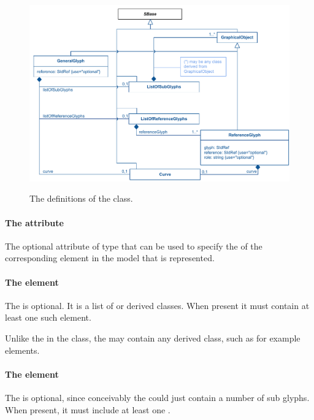 \begin{figure}[!h]
\includegraphics[scale=0.9]{uml/layout-generalglyph-model-uml}\\
\label{uml:generalglyph}
\caption{The definitions of the \GeneralGlyph class.}
\end{figure}

\paragraph{The  attribute}
The optional  attribute of type  that 
can be used to specify the  of the corresponding element in 
the model that is represented. 


\paragraph {The  element}
\label{listofsubglyphs-class}
The \ListOfSubGlyphs is optional. It is a list of \GraphicalObject or 
derived classes. When present it must contain at least one such element. 

Unlike the \ListOfAdditionalGraphicalObjects in the \LayoutClass class, 
the  may contain any derived class, such as for 
example \TextGlyph elements. 


\paragraph {The  element}
\label{listofreferenceglyphs-class}
The \ListOfReferenceGlyphs is optional, since conceivably the \GeneralGlyph could just contain a number of sub glyphs. When present, it must include at least one \ReferenceGlyph. 


